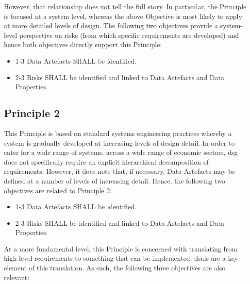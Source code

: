 However, that relationship does not tell the full story. In particular, the Principle is focused at a system level, whereas the above Objective is most likely to apply at more detailed levels of design. The following two objectives provide a system-level perspective on risks (from which specific requirements are developed) and hence both objectives directly support this Principle:

\begin{itemize}
	\item \textcolor{dsiwgAccentColour}{1-3} Data Artefacts SHALL be identified.
	\item \textcolor{dsiwgAccentColour}{2-3} Risks SHALL be identified and linked to Data Artefacts and Data Properties.
\end{itemize}


\subsection{Principle 2}

This Principle is based on standard systems engineering practices whereby a system is gradually developed at increasing levels of design detail. In order to cater for a wide range of systems, across a wide range of economic sectors, \gls{dsg} does not specifically require an explicit hierarchical decomposition of requirements. However, it does note that, if necessary, Data Artefacts may be defined at a number of levels of increasing detail. Hence, the following two objectives are related to Principle 2:

\begin{itemize}
	\item \textcolor{dsiwgAccentColour}{1-3} Data Artefacts SHALL be identified.
	\item \textcolor{dsiwgAccentColour}{2-3} Risks SHALL be identified and linked to Data Artefacts and Data Properties.
\end{itemize}

At a more fundamental level, this Principle is concerned with translating from high-level requirements to something that can be implemented. \Glspl{dsal} are a key element of this translation. As such, the following three objectives are also relevant:

